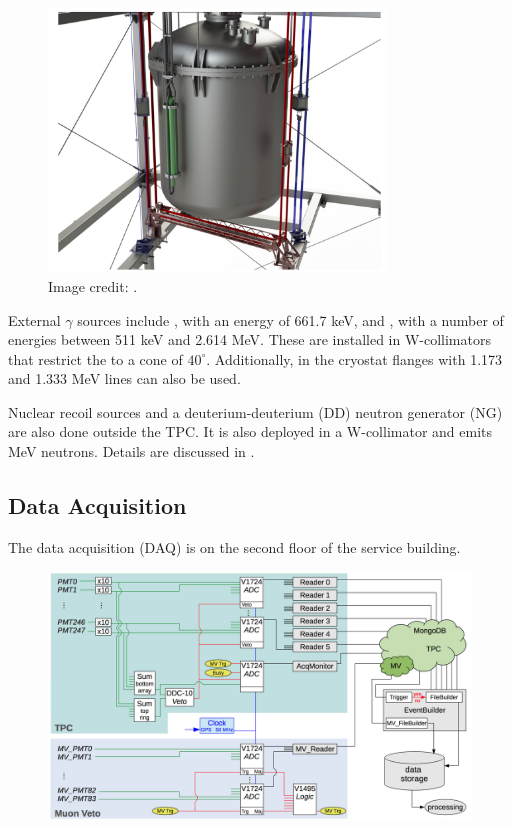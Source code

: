 \begin{figure}
\centering
\includegraphics[width=0.8\textwidth]{TPCCalibrations}
\caption{Image credit: .}
\label{fig:xenon1t_calibrations_belts}
\end{figure}

External $\gamma$ sources include , with an energy of 661.7 keV, and , with a number of energies between 511 keV
and 2.614 MeV.  These are installed in W-collimators that restrict the \gammarays to a cone of $40^{\circ}$.  Additionally, 
in the cryostat flanges with 1.173 and 1.333 MeV lines can also be used.

Nuclear recoil sources \ambe and a deuterium-deuterium (DD) neutron generator (NG) are also done outside the TPC.  It is also deployed in a
W-collimator and emits MeV neutrons.  Details are discussed in .



\subsection{Data Acquisition}
\label{subsec:xenon1t_daq}

The data acquisition (DAQ) is on the second floor of the service building.

\begin{figure}
\centering
\includegraphics[width=\textwidth]{DAQ}
\label{fig:xenon1t_daq_schematic}
\end{figure}


